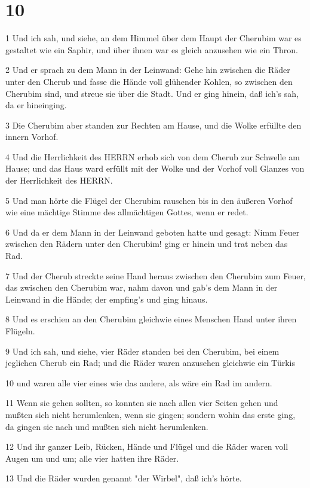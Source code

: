 \chapter{10}

\par 1 Und ich sah, und siehe, an dem Himmel über dem Haupt der Cherubim war es gestaltet wie ein Saphir, und über ihnen war es gleich anzusehen wie ein Thron.
\par 2 Und er sprach zu dem Mann in der Leinwand: Gehe hin zwischen die Räder unter den Cherub und fasse die Hände voll glühender Kohlen, so zwischen den Cherubim sind, und streue sie über die Stadt. Und er ging hinein, daß ich's sah, da er hineinging.
\par 3 Die Cherubim aber standen zur Rechten am Hause, und die Wolke erfüllte den innern Vorhof.
\par 4 Und die Herrlichkeit des HERRN erhob sich von dem Cherub zur Schwelle am Hause; und das Haus ward erfüllt mit der Wolke und der Vorhof voll Glanzes von der Herrlichkeit des HERRN.
\par 5 Und man hörte die Flügel der Cherubim rauschen bis in den äußeren Vorhof wie eine mächtige Stimme des allmächtigen Gottes, wenn er redet.
\par 6 Und da er dem Mann in der Leinwand geboten hatte und gesagt: Nimm Feuer zwischen den Rädern unter den Cherubim! ging er hinein und trat neben das Rad.
\par 7 Und der Cherub streckte seine Hand heraus zwischen den Cherubim zum Feuer, das zwischen den Cherubim war, nahm davon und gab's dem Mann in der Leinwand in die Hände; der empfing's und ging hinaus.
\par 8 Und es erschien an den Cherubim gleichwie eines Menschen Hand unter ihren Flügeln.
\par 9 Und ich sah, und siehe, vier Räder standen bei den Cherubim, bei einem jeglichen Cherub ein Rad; und die Räder waren anzusehen gleichwie ein Türkis
\par 10 und waren alle vier eines wie das andere, als wäre ein Rad im andern.
\par 11 Wenn sie gehen sollten, so konnten sie nach allen vier Seiten gehen und mußten sich nicht herumlenken, wenn sie gingen; sondern wohin das erste ging, da gingen sie nach und mußten sich nicht herumlenken.
\par 12 Und ihr ganzer Leib, Rücken, Hände und Flügel und die Räder waren voll Augen um und um; alle vier hatten ihre Räder.
\par 13 Und die Räder wurden genannt "der Wirbel", daß ich's hörte.
